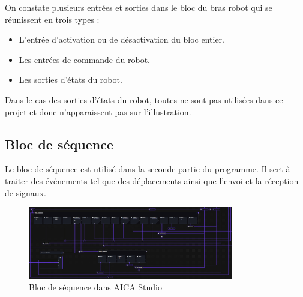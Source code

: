 On constate plusieurs entrées et sorties dans le bloc du bras robot qui se réunissent en trois types :
\begin{itemize}
    \item L'entrée d'activation ou de désactivation du bloc entier.
    \item Les entrées de commande du robot.
    \item Les sorties d'états du robot.
\end{itemize}
Dans le cas des sorties d'états du robot, toutes ne sont pas utilisées dans ce projet et donc n'apparaissent pas sur l'illustration.



\subsection{Bloc de séquence}

Le bloc de séquence est utilisé dans la seconde partie du programme. Il sert à traiter des événements tel que des déplacements ainsi que l'envoi et la réception de signaux.

\begin{figure}[H]
    \centering
    \includegraphics[width=0.8\textwidth]{assets/figures/AICA_Sequence (2).png}
    \caption{Bloc de séquence dans AICA Studio}
    \label{fig:sequence_block}
\end{figure}

